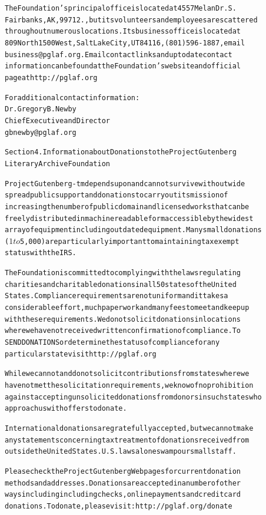 \documentclass[12pt]{book}[2005/09/16]
\newenvironment{PGtext}{%
\begin{alltt}
\fontsize{8.1}{10}\ttfamily\selectfont}%
{\end{alltt}}
\renewcommand{\(}{{\upshape(}}
\renewcommand{\)}{{\upshape)}}
\begin{document}
\begin{PGtext}
The Foundation's principal office is located at 4557 Melan Dr. S.
Fairbanks, AK, 99712., but its volunteers and employees are scattered
throughout numerous locations.  Its business office is located at
809 North 1500 West, Salt Lake City, UT 84116, (801) 596-1887, email
business@pglaf.org.  Email contact links and up to date contact
information can be found at the Foundation's web site and official
page at http://pglaf.org

For additional contact information:
     Dr. Gregory B. Newby
     Chief Executive and Director
     gbnewby@pglaf.org


Section 4.  Information about Donations to the Project Gutenberg
Literary Archive Foundation

Project Gutenberg-tm depends upon and cannot survive without wide
spread public support and donations to carry out its mission of
increasing the number of public domain and licensed works that can be
freely distributed in machine readable form accessible by the widest
array of equipment including outdated equipment.  Many small donations
($1 to $5,000) are particularly important to maintaining tax exempt
status with the IRS.

The Foundation is committed to complying with the laws regulating
charities and charitable donations in all 50 states of the United
States.  Compliance requirements are not uniform and it takes a
considerable effort, much paperwork and many fees to meet and keep up
with these requirements.  We do not solicit donations in locations
where we have not received written confirmation of compliance.  To
SEND DONATIONS or determine the status of compliance for any
particular state visit http://pglaf.org

While we cannot and do not solicit contributions from states where we
have not met the solicitation requirements, we know of no prohibition
against accepting unsolicited donations from donors in such states who
approach us with offers to donate.

International donations are gratefully accepted, but we cannot make
any statements concerning tax treatment of donations received from
outside the United States.  U.S. laws alone swamp our small staff.

Please check the Project Gutenberg Web pages for current donation
methods and addresses.  Donations are accepted in a number of other
ways including including checks, online payments and credit card
donations.  To donate, please visit: http://pglaf.org/donate



\end{PGtext}
\end{document}
